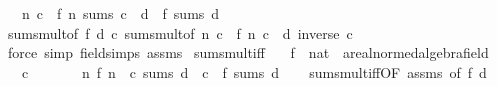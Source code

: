 \begin{isabellebody}
\ \ \ {\isachardoublequoteopen}{\isacharparenleft}{\kern0pt}{\isasymlambda}n{\isachardot}{\kern0pt}\ c\ {\isacharasterisk}{\kern0pt}\ f\ n{\isacharparenright}{\kern0pt}\ sums\ {\isacharparenleft}{\kern0pt}c\ {\isacharasterisk}{\kern0pt}\ d{\isacharparenright}{\kern0pt}\ {\isasymlongleftrightarrow}\ f\ sums\ d{\isachardoublequoteclose}\isanewline
%
\isadelimproof
\ \ %
\endisadelimproof
%
\isatagproof
{}\isamarkupfalse%
\ sums{\isacharunderscore}{\kern0pt}mult{\isacharbrackleft}{\kern0pt}of\ f\ d\ c{\isacharbrackright}{\kern0pt}\ sums{\isacharunderscore}{\kern0pt}mult{\isacharbrackleft}{\kern0pt}of\ {\isachardoublequoteopen}{\isasymlambda}n{\isachardot}{\kern0pt}\ c\ {\isacharasterisk}{\kern0pt}\ f\ n{\isachardoublequoteclose}\ {\isachardoublequoteopen}c\ {\isacharasterisk}{\kern0pt}\ d{\isachardoublequoteclose}\ {\isachardoublequoteopen}inverse\ c{\isachardoublequoteclose}{\isacharbrackright}{\kern0pt}\isanewline
\ \ \isamarkupfalse%
\ {\isacharparenleft}{\kern0pt}force\ simp{\isacharcolon}{\kern0pt}\ field{\isacharunderscore}{\kern0pt}simps\ assms{\isacharparenright}{\kern0pt}%
\endisatagproof
{\isafoldproof}%
%
\isadelimproof
\isanewline
%
\endisadelimproof
\isanewline
{}\isamarkupfalse%
\ sums{\isacharunderscore}{\kern0pt}mult{}{\isacharunderscore}{\kern0pt}iff{\isacharcolon}{\kern0pt}\isanewline
\ \ \ f\ {\isacharcolon}{\kern0pt}{\isacharcolon}{\kern0pt}\ {\isachardoublequoteopen}nat\ {\isasymRightarrow}\ {\isacharprime}{\kern0pt}a{\isacharcolon}{\kern0pt}{\isacharcolon}{\kern0pt}{\isacharbraceleft}{\kern0pt}real{\isacharunderscore}{\kern0pt}normed{\isacharunderscore}{\kern0pt}algebra{\isacharcomma}{\kern0pt}field{\isacharbraceright}{\kern0pt}{\isachardoublequoteclose}\isanewline
\ \ \ {\isachardoublequoteopen}c\ {\isasymnoteq}\ {}{\isachardoublequoteclose}\isanewline
\ \ \ \ \ {\isachardoublequoteopen}{\isacharparenleft}{\kern0pt}{\isasymlambda}n{\isachardot}{\kern0pt}\ f\ n\ {\isacharasterisk}{\kern0pt}\ c{\isacharparenright}{\kern0pt}\ sums\ {\isacharparenleft}{\kern0pt}d\ {\isacharasterisk}{\kern0pt}\ c{\isacharparenright}{\kern0pt}\ {\isasymlongleftrightarrow}\ f\ sums\ d{\isachardoublequoteclose}\isanewline
%
\isadelimproof
\ \ %
\endisadelimproof
%
\isatagproof
{}\isamarkupfalse%
\ sums{\isacharunderscore}{\kern0pt}mult{\isacharunderscore}{\kern0pt}iff{\isacharbrackleft}{\kern0pt}OF\ assms{\isacharcomma}{\kern0pt}\ of\ f\ d{\isacharbrackright}{\kern0pt}\ \isamarkupfalse%

\end{isabellebody}
